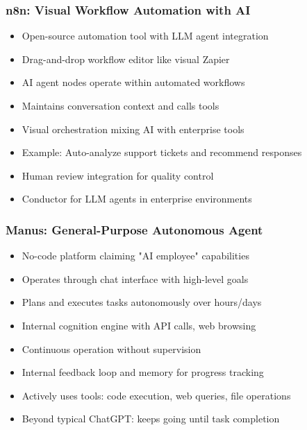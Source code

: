 \begin{frame}[fragile]\frametitle{n8n: Visual Workflow Automation with AI}
      \begin{itemize}
	  \item Open-source automation tool with LLM agent integration
	  \item Drag-and-drop workflow editor like visual Zapier
	  \item AI agent nodes operate within automated workflows
	  \item Maintains conversation context and calls tools
	  \item Visual orchestration mixing AI with enterprise tools
	  \item Example: Auto-analyze support tickets and recommend responses
	  \item Human review integration for quality control
	  \item Conductor for LLM agents in enterprise environments
	  \end{itemize}
\end{frame}

\begin{frame}[fragile]\frametitle{Manus: General-Purpose Autonomous Agent}
      \begin{itemize}
	  \item No-code platform claiming "AI employee" capabilities
	  \item Operates through chat interface with high-level goals
	  \item Plans and executes tasks autonomously over hours/days
	  \item Internal cognition engine with API calls, web browsing
	  \item Continuous operation without supervision
	  \item Internal feedback loop and memory for progress tracking
	  \item Actively uses tools: code execution, web queries, file operations
	  \item Beyond typical ChatGPT: keeps going until task completion
	  \end{itemize}
\end{frame}

